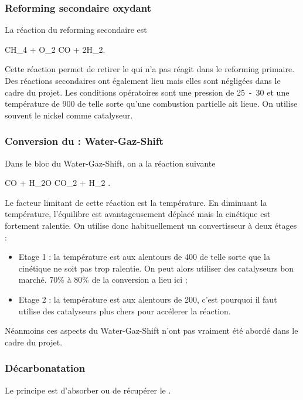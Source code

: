 \subsubsection{Reforming secondaire oxydant}
La réaction du reforming secondaire est
\begin{chemmath}
	CH_4 + O_2 \rightarrow CO + 2H_2.
\end{chemmath}
Cette réaction permet de retirer le  qui n'a
pas réagit dans le reforming primaire. %
Des réactions secondaires ont également lieu mais elles
sont négligées dans le cadre du projet.
Les conditions opératoires sont une pression
de \unit{25-30}{\bbar} et une température
de \unit{900}{\degreecelsius} de telle sorte
qu'une combustion partielle ait lieue.
On utilise souvent le nickel comme catalyseur.

\subsubsection{Conversion du  : Water-Gaz-Shift}
Dans le bloc du Water-Gaz-Shift, on a la réaction
suivante
\begin{chemmath}
	CO + H_2O \Leftrightarrow CO_2 + H_2 . 
\end{chemmath}
Le facteur limitant de cette réaction est la température.
En diminuant la température, l'équilibre est avantageusement
déplacé mais la cinétique est fortement ralentie. On
utilise donc habituellement un convertisseur à deux étages :
\begin{itemize}
	\item	Etage 1 : la température est aux alentours de
	\unit{400}{\degreecelsius} de telle sorte que la cinétique
	ne soit pas trop ralentie. On peut alors utiliser
	des catalyseurs bon marché. 70\% à 80\% de la conversion a lieu
	ici ;
	\item Etage 2 : la température est aux alentours de
	\unit{200}{\degreecelsius}, c'est pourquoi il faut utilise
	des catalyseurs plus chers pour accélerer la réaction.
\end{itemize}

Néanmoins ces aspects du Water-Gaz-Shift n'ont pas
vraiment été abordé dans le cadre du projet.

\subsubsection{Décarbonatation}
Le principe est d'absorber ou de récupérer le .

